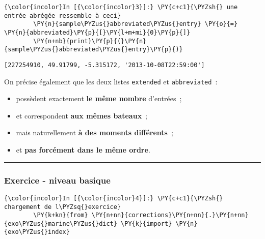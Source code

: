     \begin{Verbatim}[commandchars=\\\{\},frame=single,framerule=0.3mm,rulecolor=\color{cellframecolor}]
{\color{incolor}In [{\color{incolor}3}]:} \PY{c+c1}{\PYZsh{} une entrée abrégée ressemble à ceci}
        \PY{n}{sample\PYZus{}abbreviated\PYZus{}entry} \PY{o}{=} \PY{n}{abbreviated}\PY{p}{[}\PY{l+m+mi}{0}\PY{p}{]}
        \PY{n+nb}{print}\PY{p}{(}\PY{n}{sample\PYZus{}abbreviated\PYZus{}entry}\PY{p}{)}
\end{Verbatim}


    \begin{Verbatim}[commandchars=\\\{\},frame=single,framerule=0.3mm,rulecolor=\color{cellframecolor}]
[227254910, 49.91799, -5.315172, '2013-10-08T22:59:00']
\end{Verbatim}

    On précise également que les deux listes \texttt{extended} et
\texttt{abbreviated}~:

\begin{itemize}
\tightlist
\item
  possèdent exactement \textbf{le même nombre} d'entrées~;
\item
  et correspondent \textbf{aux mêmes bateaux}~;
\item
  mais naturellement \textbf{à des moments différents}~;
\item
  et \textbf{pas forcément dans le même ordre}.
\end{itemize}

    \begin{center}\rule{0.5\linewidth}{\linethickness}\end{center}

    \hypertarget{exercice---niveau-basique}{%
\subsubsection{Exercice - niveau
basique}\label{exercice---niveau-basique}}

    \begin{Verbatim}[commandchars=\\\{\},frame=single,framerule=0.3mm,rulecolor=\color{cellframecolor}]
{\color{incolor}In [{\color{incolor}4}]:} \PY{c+c1}{\PYZsh{} chargement de l\PYZsq{}exercice}
        \PY{k+kn}{from} \PY{n+nn}{corrections}\PY{n+nn}{.}\PY{n+nn}{exo\PYZus{}marine\PYZus{}dict} \PY{k}{import} \PY{n}{exo\PYZus{}index}
\end{Verbatim}


